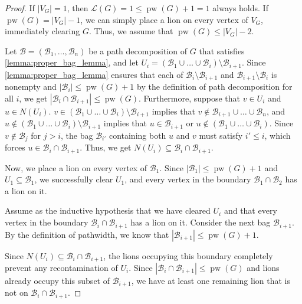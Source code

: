 \documentclass[a4paper,UKenglish,cleveref, autoref, thm-restate]{lipics-v2021}
\begin{document}
\begin{proof}
If $|V_G|=1$, then $\mathcal{L}(G)=1\le \operatorname{pw}(G)+1=1$ always holds. If $\operatorname{pw}(G)=|V_G|-1$, we can simply place a lion on every vertex of $V_G$, immediately clearing $G$. Thus, we assume that $\operatorname{pw}(G) \leq |V_G|-2$.

Let $\mathcal{B}=(\mathcal{B}_1, \dots, \mathcal{B}_n)$ be a path decomposition of $G$ that satisfies \cref{lemma:proper_bag_lemma}, and let $U_i=(\mathcal{B}_1 \cup \dots \cup \mathcal{B}_i) \setminus \mathcal{B}_{i+1}$. Since \cref{lemma:proper_bag_lemma} ensures that each of $\mathcal{B}_i \setminus \mathcal{B}_{i+1}$ and $\mathcal{B}_{i+1} \setminus \mathcal{B}_i$ is nonempty and $|\mathcal{B}_{i}|\leq \operatorname{pw}(G)+1$ by the definition of path decomposition for all $i$, we get $|\mathcal{B}_i \cap \mathcal{B}_{i+1}| \leq \operatorname{pw}(G)$. Furthermore, suppose that $v\in U_i$ and $u\in N(U_i)$. $v\in (\mathcal{B}_1 \cup \dots \cup \mathcal{B}_i) \setminus \mathcal{B}_{i+1}$ implies that $v\notin \mathcal{B}_{i+1} \cup \dots \cup \mathcal{B}_n$, and $u\notin (\mathcal{B}_1 \cup \dots \cup \mathcal{B}_i) \setminus \mathcal{B}_{i+1}$ implies that $u\in \mathcal{B}_{i+1}$ or $u\notin (\mathcal{B}_1 \cup \dots \cup \mathcal{B}_i)$. Since $v \notin \mathcal{B}_{j}$ for $j > i$, the bag $\mathcal{B}_{i'}$ containing both $u$ and $v$ must satisfy $i' \le i$, which forces $u \in \mathcal{B}_i \cap \mathcal{B}_{i+1}$. Thus, we get $N(U_i) \subseteq \mathcal{B}_i \cap \mathcal{B}_{i+1}$.

Now, we place a lion on every vertex of $\mathcal{B}_1$. Since $|\mathcal{B}_1| \leq \operatorname{pw}(G)+1$ and $U_1 \subseteq \mathcal{B}_1$, we successfully clear $U_1$, and every vertex in the boundary $\mathcal{B}_1 \cap \mathcal{B}_2$ has a lion on it.

Assume as the inductive hypothesis that we have cleared $U_i$ and that every vertex in the boundary $\mathcal{B}_i \cap \mathcal{B}_{i+1}$ has a lion on it.
Consider the next bag $\mathcal{B}_{i+1}$. By the definition of pathwidth, we know that $|\mathcal{B}_{i+1}| \leq \operatorname{pw}(G)+1$.

Since $N(U_i) \subseteq \mathcal{B}_i \cap \mathcal{B}_{i+1}$, the lions occupying this boundary completely prevent any recontamination of $U_i$. Since $|\mathcal{B}_i \cap \mathcal{B}_{i+1}| \leq \operatorname{pw}(G)$ and lions already occupy this subset of $\mathcal{B}_{i+1}$, we have at least one remaining lion that is not on $\mathcal{B}_i \cap \mathcal{B}_{i+1}$.


\end{proof}
\end{document}
